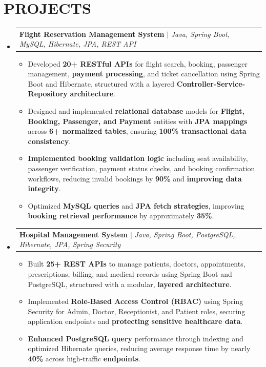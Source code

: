 \documentclass[letterpaper,11pt]{article}
\makeatletter
\newcommand{\resumeItem}[1]{\item\normalsize{{#1 \vspace{0pt}}}}
\newcommand{\resumeProjectHeading}[2]{
    \item
    \begin{tabular*}{1.001\textwidth}{l@{\extracolsep{\fill}}r}
      \normalsize#1 & \textbf{\normalsize #2}\\
    \end{tabular*}\vspace{0pt}
}
\newcommand{\resumeSubHeadingListStart}{\begin{itemize}[leftmargin=0.0in, label={}, topsep=1pt, itemsep=1pt, parsep=0pt]}
\newcommand{\resumeSubHeadingListEnd}{\end{itemize}\vspace{-4pt}}
\makeatother
\begin{document}
\section{PROJECTS}
\resumeSubHeadingListStart
\vspace{-2pt}
\resumeProjectHeading
{\textbf{Flight Reservation Management System} $|$ \emph{Java, Spring Boot, MySQL, Hibernate, JPA, REST API}}{}
\begin{itemize}[label=\textbullet, itemsep=-2pt, topsep=1pt, leftmargin=0.2in]
\resumeItem{Developed \textbf{20+ RESTful APIs} for flight search, booking, passenger management, \textbf{payment processing}, and ticket cancellation using Spring Boot and Hibernate, structured with a layered \textbf{Controller-Service-Repository} \textbf{architecture}.}
\resumeItem{Designed and implemented \textbf{relational database} models for \textbf{Flight, Booking, Passenger, and Payment} entities with \textbf{JPA mappings} across \textbf{6+ normalized tables}, ensuring \textbf{100\% transactional data consistency}.}
\resumeItem{\textbf{Implemented booking validation logic} including seat availability, passenger verification, payment status checks, and booking confirmation workflows, reducing invalid bookings by \textbf{90\%} and \textbf{improving data integrity}.}
\vspace{-2pt}
\resumeItem{Optimized \textbf{MySQL queries} and \textbf{JPA fetch strategies}, improving \textbf{booking retrieval performance} by approximately \textbf{35\%}.}
\end{itemize}\vspace{-4pt}
\vspace{-7pt}
\resumeProjectHeading
{\textbf{Hospital Management System} $|$ \emph{Java, Spring Boot, PostgreSQL, Hibernate, JPA, Spring Security}}{}
\begin{itemize}[label=\textbullet, itemsep=-2pt, topsep=1pt, leftmargin=0.2in]
\resumeItem{Built \textbf{25+ REST APIs} to manage patients, doctors, appointments, prescriptions, billing, and medical records using Spring Boot and PostgreSQL, structured with a modular, \textbf{layered architecture}.}
\resumeItem{Implemented \textbf{Role-Based Access Control (RBAC)} using Spring Security for Admin, Doctor, Receptionist, and Patient roles, securing application endpoints and \textbf{protecting sensitive healthcare data}.}
\resumeItem{\textbf{Enhanced PostgreSQL query} performance through indexing and optimized Hibernate queries, reducing average response time by nearly \textbf{40\%} across high-traffic \textbf{endpoints}.}
\end{itemize}\vspace{-4pt}
\resumeSubHeadingListEnd
\end{document}
